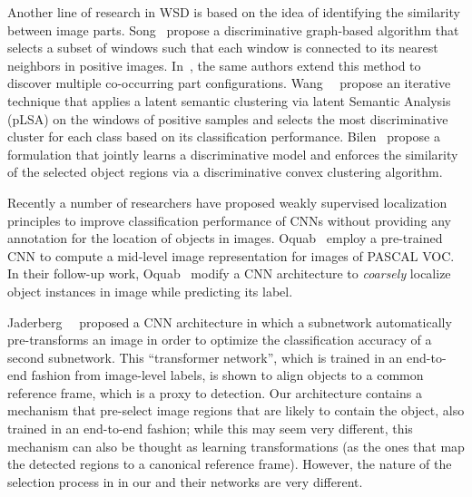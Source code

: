 \documentclass[10pt,twocolumn,letterpaper]{article}
\begin{document}
Another line of research in WSD \cite{Song14,Song14a,Wang14a} is based on the idea of identifying the similarity between image parts. Song~\etal\cite{Song14} propose a discriminative graph-based algorithm that selects a subset of windows such that each window is connected to its nearest neighbors in positive images. In~\cite{Song14a}, the same authors extend this method to discover multiple co-occurring part configurations. Wang~\etal~\cite{Wang14a} propose an iterative technique that applies a latent semantic clustering via latent Semantic Analysis (pLSA) on the windows of positive samples and selects the most discriminative cluster for each class based on its classification performance. Bilen~\etal\cite{Bilen15} propose a formulation that jointly learns a discriminative model and enforces the similarity of the selected object regions via a discriminative convex clustering algorithm.

Recently a number of researchers \cite{Oquab14,Oquab15} have proposed weakly supervised localization principles to improve classification performance of CNNs without providing any annotation for the location of objects in images. Oquab~\etal\cite{Oquab14} employ a pre-trained CNN to compute a mid-level image representation for images of PASCAL VOC. In their follow-up work, Oquab~\etal\cite{Oquab15} modify a CNN architecture to \emph{coarsely} localize object instances in image while predicting its label. 

Jaderberg~\etal~\cite{Jaderberg15c} proposed a CNN architecture in which a subnetwork automatically pre-transforms an image in order to optimize the classification accuracy of a second subnetwork. This ``transformer network'', which is trained in an end-to-end fashion from image-level labels, is shown to align objects to a common reference frame, which is a proxy to detection. Our architecture contains a mechanism that pre-select image regions that are likely to contain the object, also trained in an end-to-end fashion; while this may seem very different, this mechanism can also be thought as learning transformations (as the ones that map the detected regions to a canonical reference frame). However, the nature of the selection process in in our and their networks are very different.
\end{document}

